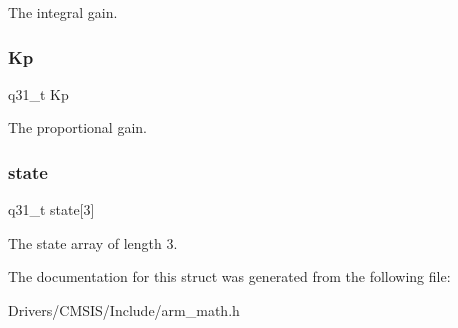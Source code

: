 The integral gain. \mbox{\label{structarm__pid__instance__q31_a6ec4b37fe2246a7e017dd07578fe5bbd}} 
\subsubsection{\texorpdfstring{Kp}{Kp}}
{\footnotesize\ttfamily q31\+\_\+t Kp}

The proportional gain. \mbox{\label{structarm__pid__instance__q31_af0a2da4da9a94af652873ec7e7be4880}} 
\subsubsection{\texorpdfstring{state}{state}}
{\footnotesize\ttfamily q31\+\_\+t state\mbox{[}3\mbox{]}}

The state array of length 3. 

The documentation for this struct was generated from the following file\+:\begin{DoxyCompactItemize}
\item 
Drivers/\+C\+M\+S\+I\+S/\+Include/arm\+\_\+math.\+h\end{DoxyCompactItemize}
